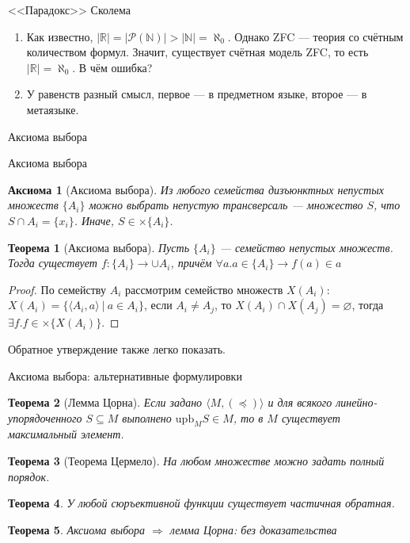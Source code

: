 \documentclass[aspectratio=169]{beamer}
\newtheorem{axm}{Аксиома}[section]
\newtheorem{thm}{Теорема}[section]
\begin{document}
\begin{frame}{<<Парадокс>> Сколема}
\begin{enumerate}
\item Как известно, $|\mathbb{R}| = |\mathcal{P}(\mathbb{N})| > |\mathbb{N}| = \aleph_0$. \pause Однако ZFC --- теория со счётным
количеством формул. \pause
Значит, существует счётная модель ZFC, то есть $|\mathbb{R}| = \aleph_0$. \pause В чём ошибка? \pause
\item У равенств разный смысл, первое --- в предметном языке, второе --- в метаязыке. 
\end{enumerate}
\end{frame}

\begin{frame}
\begin{center}\LARGE Аксиома выбора \end{center}
\end{frame}


\begin{frame}{Аксиома выбора}
\begin{axm}[Аксиома выбора]
Из любого семейства дизъюнктных непустых множеств $\{A_i\}$ можно выбрать непустую трансверсаль --- 
множество $S$, что $S \cap A_i = \{ x_i \}$. Иначе, $S \in \times \{A_i\}$.
\end{axm}

\begin{thm}[Аксиома выбора]
Пусть $\{A_i\}$ --- семейство непустых множеств. Тогда существует
$f : \{A_i\} \rightarrow \cup A_i$, причём $\forall a.a \in \{A_i\} \rightarrow f(a) \in a$
\end{thm}

\begin{proof}По семейству $A_i$ рассмотрим семейство множеств $X(A_i)$:
$X(A_i) = \{ \langle A_i, a \rangle \ |\ a \in A_i \}$, если $A_i \ne A_j$, то $X(A_i) \cap X(A_j) = \varnothing$,
тогда $\exists f.f \in \times \{ X(A_i) \}$.
\end{proof}
Обратное утверждение также легко показать.
\end{frame}

\begin{frame}{Аксиома выбора: альтернативные формулировки}
\begin{thm}[Лемма Цорна]
Если задано $\langle M, (\preceq) \rangle$ и для всякого линейно-упорядоченного $S \subseteq M$ выполнено
$\text{upb}_M S \in M$, то в $M$ существует максимальный элемент.
\end{thm}
\begin{thm}[Теорема Цермело]
На любом множестве можно задать полный порядок.
\end{thm}
\begin{thm}
У любой сюръективной функции существует частичная обратная.
\end{thm}

\begin{thm}
Аксиома выбора $\Rightarrow$ лемма Цорна: без доказательства
\end{thm}
\end{frame}
\end{document}
